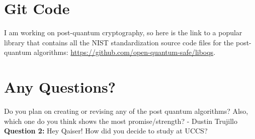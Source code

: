 \section{Git Code}
I am working on post-quantum cryptography, so here is the link to a popular library that contains all the NIST standardization source code files for the post-quantum algorithms:
\href{https://github.com/open-quantum-safe/liboqs}{https://github.com/open-quantum-safe/liboqs}.

\section{Any Questions?}
Do you plan on creating or revising any of the post quantum algorithms? Also, which one do you think shows the most promise/strength? - Dustin Trujillo 
\textbf{Question 2:} Hey Qaiser! How did you decide to study at UCCS?
%
%
